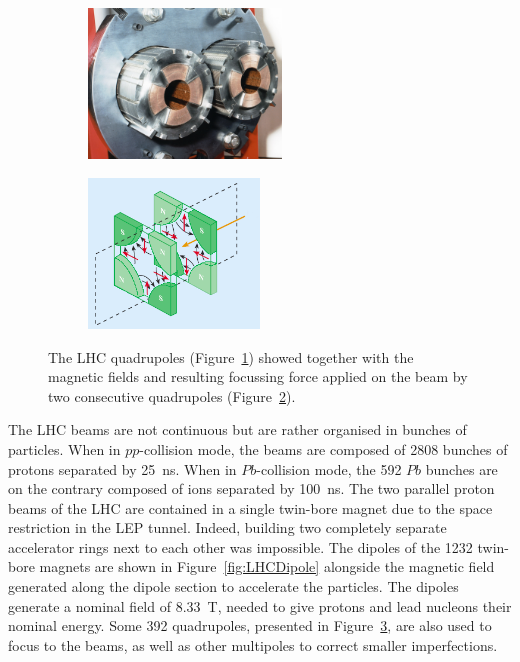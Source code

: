 	\begin{figure}[H]
		\begin{subfigure}{0.5\linewidth}
			\centering
			\includegraphics[height = 4cm]{fig/chapt2/LHC-quadrupole.jpg}
			\caption{\label{fig:LHCQuadrupole:A}}
		\end{subfigure}
		\begin{subfigure}{0.5\linewidth}
			\centering
			\includegraphics[height = 4cm]{fig/chapt2/LHC-quadrupole-field.png}
			\caption{\label{fig:LHCQuadrupole:B}}
		\end{subfigure}
		\caption{\label{fig:LHCQuadrupole} The LHC quadrupoles (Figure~\ref{fig:LHCQuadrupole:A}) showed together with the magnetic fields and resulting focussing force applied on the beam by two consecutive quadrupoles (Figure~\ref{fig:LHCQuadrupole:B}).}
	\end{figure}
	
	The LHC beams are not continuous but are rather organised in bunches of particles. When in $pp$-collision mode, the beams are composed of 2808 bunches of  protons separated by \SI{25}{ns}. When in $Pb$-collision mode, the 592 $Pb$ bunches are on the contrary composed of  ions separated by \SI{100}{ns}. The two parallel proton beams of the LHC are contained in a single twin-bore magnet due to the space restriction in the LEP tunnel. Indeed, building two completely separate accelerator rings next to each other was impossible. The dipoles of the 1232 twin-bore magnets are shown in Figure~\ref{fig:LHCDipole} alongside the magnetic field generated along the dipole section to accelerate the particles. The dipoles generate a nominal field of \SI{8.33}{T}, needed to give protons and lead nucleons their nominal energy. Some 392 quadrupoles, presented in Figure~\ref{fig:LHCQuadrupole}, are also used to focus to the beams, as well as other multipoles to correct smaller imperfections.
	
